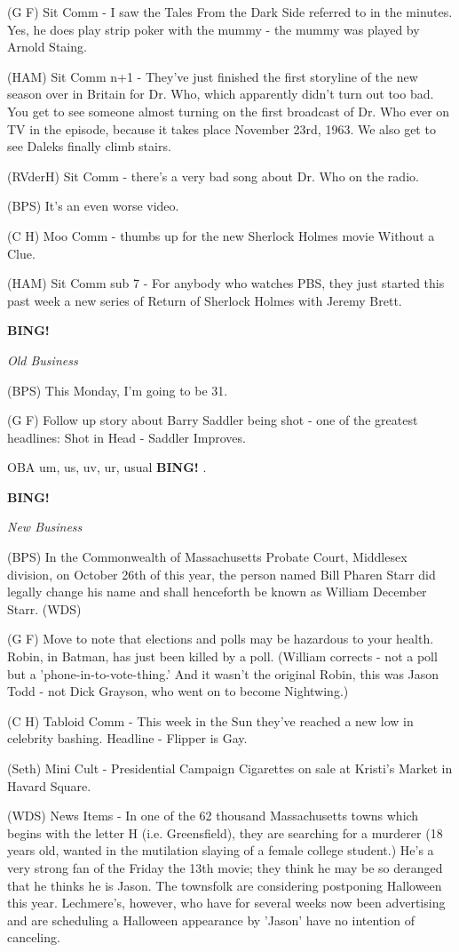 \documentclass[12pt]{article}
\newcommand{\bing}{{\bf BING!} }
\newcommand{\goto}[1]{\bing \vskip 12pt \centerline{{\em{#1}}}}
\begin{document}
(G F) Sit Comm - I saw the Tales From the Dark Side referred to in the minutes. Yes, he does play strip poker with the mummy - the mummy was played by Arnold Staing.

(HAM) Sit Comm n+1 - They've just finished the first storyline of the new season over in Britain for Dr. Who, which apparently didn't turn out too bad. You get to see someone almost turning on the first broadcast of Dr. Who ever on TV in the episode, because it takes place November 23rd, 1963. We also get to see Daleks finally climb stairs.

(RVderH) Sit Comm - there's a very bad song about Dr. Who on the radio.

(BPS) It's an even worse video.

(C H) Moo Comm - thumbs up for the new Sherlock Holmes movie Without a Clue.

(HAM) Sit Comm sub 7 - For anybody who watches PBS, they just started this past week a new series of Return of Sherlock Holmes with Jeremy Brett.

\goto{Old Business}

(BPS) This Monday, I'm going to be 31.

(G F) Follow up story about Barry Saddler being shot - one of the greatest headlines: Shot in Head - Saddler Improves.

OBA um, us, uv, ur, usual \bing.

\goto{New Business}

(BPS) In the Commonwealth of Massachusetts Probate Court, Middlesex division, on October 26th of this year, the person named Bill Pharen Starr did legally change his name and shall henceforth be known as William December Starr. (WDS)

(G F) Move to note that elections and polls may be hazardous to your health. Robin, in Batman, has just been killed by a poll. (William corrects - not a poll but a 'phone-in-to-vote-thing.' And it wasn't
the original Robin, this was Jason Todd - not Dick Grayson, who went on to become Nightwing.)

(C H) Tabloid Comm - This week in the Sun they've reached a new low in celebrity bashing. Headline - Flipper is Gay.

(Seth) Mini Cult - Presidential Campaign Cigarettes on sale at Kristi's Market in Havard Square.

(WDS) News Items - In one of the 62 thousand Massachusetts towns which begins with the letter H (i.e. Greensfield), they are searching for a murderer (18 years old, wanted in the mutilation slaying of a female college student.) He's a very strong fan of the Friday the 13th movie; they think he may be so deranged that he thinks he is Jason. The townsfolk are considering postponing Halloween this year. Lechmere's, however, who have for several weeks now been advertising and are scheduling a Halloween appearance by 'Jason' have no intention of canceling.
\end{document}
